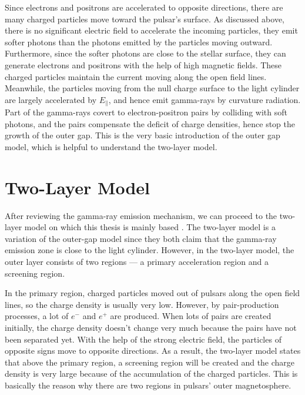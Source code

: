 \documentclass[a4paper, 12pt]{report}
\begin{document}
    Since electrons and positrons are accelerated to opposite directions, there are many 
    charged particles move toward the pulsar's surface. As discussed above, there is no 
    significant electric field to accelerate the incoming particles, they emit softer 
    photons than the photons emitted by the particles moving outward. Furthermore, since the 
    softer photons are close to the stellar surface, they can generate electrons and 
    positrons with the help of high magnetic fields. These charged particles maintain the current 
    moving along the open field lines. Meanwhile, the particles moving from the null charge 
    surface to the light cylinder are largely accelerated by $E_{\parallel}$, and hence 
    emit gamma-rays by curvature radiation. Part of the gamma-rays covert to
    electron-positron pairs by colliding with soft photons, and the pairs compensate 
    the deficit of charge densities, hence stop the growth of the outer gap. This is the 
    very basic introduction of the outer gap model, which is helpful to understand the 
    two-layer model. 
        
  \section{Two-Layer Model}
    After reviewing the gamma-ray emission mechanism, we can proceed to
    the two-layer model on which this thesis is mainly based
    \cite{0004-637X-720-1-178}. The two-layer model is a variation of the outer-gap model 
    since they both claim that the gamma-ray emission zone is close to the light cylinder. 
    However, in the two-layer model, the outer layer consists of two regions --- a primary 
    acceleration region and a screening region. 

    In the primary region, charged particles moved out of pulsars along the open field 
    lines, so the charge density is usually very low. 
    However, by pair-production processes, a lot of $e^{-}$ and $e^{+}$ are produced. 
    When lots of pairs are created initially, the charge density 
    doesn't change very much because the pairs have not been separated yet. With the help 
    of the strong electric field, the particles of opposite signs move to opposite directions. 
    As a result, the two-layer model states that above the primary region, a screening 
    region will be created and the charge density is very large because of the accumulation 
    of the charged particles. This is basically the reason why there are two regions in 
    pulsars' outer magnetosphere.
\end{document}
